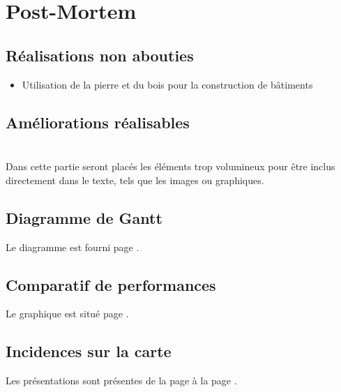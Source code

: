 \documentclass[a4paper]{memoir}
\begin{document}
	\chapter{Post-Mortem}
	
		\section{Réalisations non abouties}
			\begin{itemize}[label=$\bullet$]
				\item Utilisation de la pierre et du bois pour la construction de bâtiments
			\end{itemize}
			
		\section{Améliorations réalisables}
		
	
	\appendix
	\chapter{}
		Dans cette partie seront placés les éléments trop volumineux pour être inclus directement dans le texte, tels que les images ou graphiques.\\
		
		\section{Diagramme de Gantt}
			Le diagramme est fourni page \pageref{fig:gantt}.
			
		\section{Comparatif de performances}
			Le graphique est situé page \pageref{fig:analyse}.
			
		\section{Incidences sur la carte}
			Les présentations sont présentes de la page \pageref{fig:dilatation} à la page \pageref{fig:aleatoire}.
			
\end{document}
